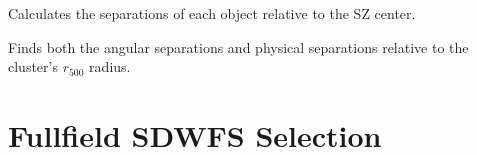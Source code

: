 \documentclass[letterpaper,12pt,english]{sphinxmanual}
\begin{document}
\begin{fulllineitems}

\begin{fulllineitems}
\label{\detokenize{api/selector:SPTclIRAGN.Pipeline_functions.SelectSDWFS.object_separations}}
\pysigstartsignatures
{}
\pysigstopsignatures
\sphinxAtStartPar
Calculates the separations of each object relative to the SZ center.

\sphinxAtStartPar
Finds both the angular separations and physical separations relative to the cluster’s \(r_{500}\) radius.

\end{fulllineitems}


\end{fulllineitems}



\section{Full\sphinxhyphen{}field SDWFS Selection}
\label{\detokenize{api/selector:full-field-sdwfs-selection}}
\end{document}
